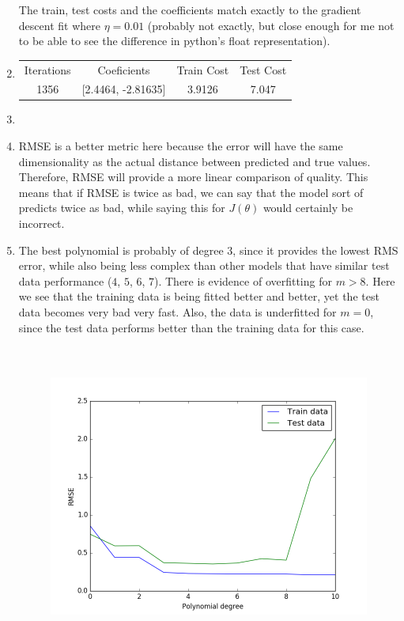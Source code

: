 \documentclass[11pt]{article}
\begin{document}
\begin{enumerate}
  The train, test costs and the coefficients match exactly to the gradient
  descent fit where $\eta = 0.01$ (probably not exactly, but close enough
  for me not to be able to see the difference in python's float
  representation).
\item
    \begin{tabular}{ c | c | c | c }
      Iterations & Coeficients & Train Cost & Test Cost \\
      1356 & [2.4464, -2.81635] & 3.9126 & 7.047
  \end{tabular}
  \item
  \item RMSE is a better metric here because the error will have the same
    dimensionality as the actual distance between predicted and true values.
    Therefore, RMSE will provide a more linear comparison of quality. This
    means that if RMSE is twice as bad, we can say that the model sort of
    predicts twice as bad, while saying this for $J(\theta)$ would certainly
    be incorrect.
  \item The best polynomial is probably of degree $3$, since it provides the
    lowest RMS error, while also being less complex than other models that
    have similar test data performance ($4$, $5$, $6$, $7$). There is evidence
    of overfitting for $m>8$. Here we see that the training data is being
    fitted better and better, yet the test data becomes very bad very fast.
    Also, the data is underfitted for $m=0$, since the test data performs
    better than the training data for this case.
    \begin{figure}[h]
      \includegraphics[height=10cm]{fig1.png}
    \end{figure}
\end{enumerate}
\end{document}

